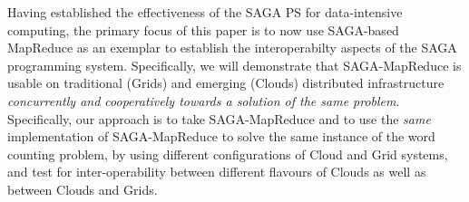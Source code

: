 \documentclass[conference,final]{IEEEtran}
\newcommand{\sagamapreduce }{SAGA-MapReduce }
\begin{document}



Having established the effectiveness of the SAGA PS for data-intensive
computing, the primary focus of this paper is to now use SAGA-based
MapReduce as an exemplar to establish the interoperabilty aspects of
the SAGA programming system.  Specifically, we will demonstrate that
\sagamapreduce is usable on traditional (Grids) and emerging (Clouds)
distributed infrastructure {\it concurrently and cooperatively towards
  a solution of the same problem}.  Specifically, our approach is to
take \sagamapreduce and to use the {\it same} implementation of
\sagamapreduce to solve the same instance of the word counting
problem, by using different configurations of Cloud and Grid systems,
and test for inter-operability between different flavours of Clouds as
well as between Clouds and Grids.
\end{document}
